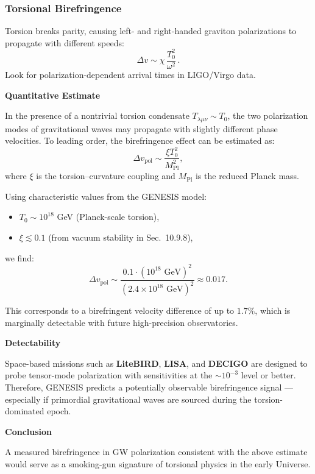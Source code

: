 \documentclass{article}
\begin{document}
\subsubsection{ Torsional Birefringence}
Torsion breaks parity, causing left- and right-handed graviton polarizations
to propagate with different speeds:
\[
  \Delta v \sim \chi\,\frac{T_0^2}{\omega^2}\,.
\]
Look for polarization-dependent arrival times in LIGO/Virgo data.

\vspace{1em}
\noindent \textbf{Quantitative Estimate}

In the presence of a nontrivial torsion condensate $T_{\lambda\mu\nu} \sim T_0$, the two polarization modes of gravitational waves may propagate with slightly different phase velocities. To leading order, the birefringence effect can be estimated as:
\begin{equation}
\Delta v_{\text{pol}} \sim \frac{\xi T_0^2}{M_{\text{Pl}}^2},
\end{equation}
where $\xi$ is the torsion–curvature coupling and $M_{\text{Pl}}$ is the reduced Planck mass.

Using characteristic values from the GENESIS model:
\begin{itemize}
    \item $T_0 \sim 10^{18}$ GeV (Planck-scale torsion),
    \item $\xi \lesssim 0.1$ (from vacuum stability in Sec.~10.9.8),
\end{itemize}
we find:
\[
\Delta v_{\text{pol}} \sim \frac{0.1 \cdot (10^{18} \text{ GeV})^2}{(2.4 \times 10^{18} \text{ GeV})^2} \approx 0.017.
\]

This corresponds to a birefringent velocity difference of up to $1.7\%$, which is marginally detectable with future high-precision observatories.

\noindent \textbf{Detectability}

Space-based missions such as \textbf{LiteBIRD}, \textbf{LISA}, and \textbf{DECIGO} are designed to probe tensor-mode polarization with sensitivities at the $\sim 10^{-3}$ level or better. Therefore, GENESIS predicts a potentially observable birefringence signal --- especially if primordial gravitational waves are sourced during the torsion-dominated epoch.

\noindent \textbf{Conclusion}

A measured birefringence in GW polarization consistent with the above estimate would serve as a smoking-gun signature of torsional physics in the early Universe.
\end{document}

